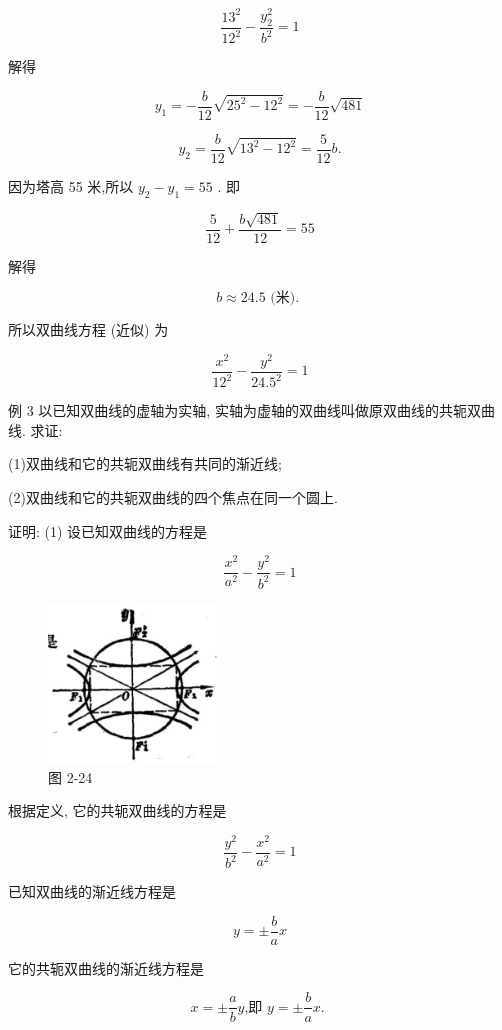 \documentclass[lang=cn,newtx,10.5pt,scheme=chinese]{elegantbook}
\begin{document}
\[
  \frac{{13}^{2}}{{12}^{2}} - \frac{{y}_{2}^{2}}{{b}^{2}} = 1
\]

解得

\[
    {y}_{1} = - \frac{b}{12}\sqrt{{25}^{2} - {12}^{2}} = - \frac{b}{12}\sqrt{481}
\]

\[
    {y}_{2} = \frac{b}{12}\sqrt{{13}^{2} - {12}^{2}} = \frac{5}{12}b.
\]

因为塔高 55 米,所以 \({y}_{2} - {y}_{1} = {55}\) . 即

\[
  \frac{5}{12} + \frac{b\sqrt{481}}{12} = {55}
\]

解得

\[
  b \approx {24.5}\text{ (米). }
\]

所以双曲线方程 (近似) 为

\[
  \frac{{x}^{2}}{{12}^{2}} - \frac{{y}^{2}}{{24.5}^{2}} = 1
\]

例 3 以已知双曲线的虚轴为实轴, 实轴为虚轴的双曲线叫做原双曲线的共轭双曲线. 求证:

(1)双曲线和它的共轭双曲线有共同的渐近线;

(2)双曲线和它的共轭双曲线的四个焦点在同一个圆上.

证明: (1) 设已知双曲线的方程是

\[
  \frac{{x}^{2}}{{a}^{2}} - \frac{{y}^{2}}{{b}^{2}} = 1
\]

\begin{figure}[h]
  \centering
  \includegraphics[max width=0.4\textwidth]{images/01912cc2-ffb6-728e-9ae7-b113ff05c64b_104_706159.jpg}
  \caption{图 2-24}
\end{figure}



根据定义, 它的共轭双曲线的方程是

\[
  \frac{{y}^{2}}{{b}^{2}} - \frac{{x}^{2}}{{a}^{2}} = 1
\]

已知双曲线的渐近线方程是

\[
  y = \pm \frac{b}{a}x
\]

它的共轭双曲线的渐近线方程是

\[
  x = \pm \frac{a}{b}y\text{,即 }y = \pm \frac{b}{a}x\text{. }
\]
\end{document}
